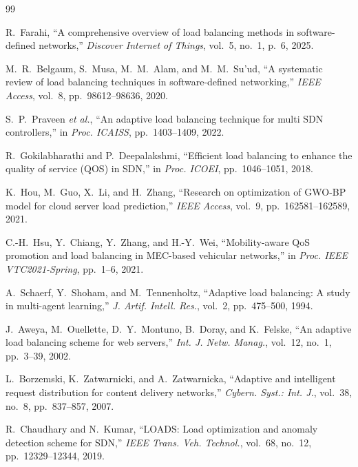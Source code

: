 \documentclass[12pt,a4paper]{report}
\begin{document}
\begin{thebibliography}{99}

R.~Farahi, ``A comprehensive overview of load balancing methods in software-defined networks,'' \textit{Discover Internet of Things}, vol.~5, no.~1, p.~6, 2025.

M.~R.~Belgaum, S.~Musa, M.~M.~Alam, and M.~M.~Su'ud, ``A systematic review of load balancing techniques in software-defined networking,'' \textit{IEEE Access}, vol.~8, pp.~98612--98636, 2020.

S.~P.~Praveen \textit{et al.}, ``An adaptive load balancing technique for multi SDN controllers,'' in \textit{Proc. ICAISS}, pp.~1403--1409, 2022.

R.~Gokilabharathi and P.~Deepalakshmi, ``Efficient load balancing to enhance the quality of service (QOS) in SDN,'' in \textit{Proc. ICOEI}, pp.~1046--1051, 2018.

K.~Hou, M.~Guo, X.~Li, and H.~Zhang, ``Research on optimization of GWO-BP model for cloud server load prediction,'' \textit{IEEE Access}, vol.~9, pp.~162581--162589, 2021.

C.-H.~Hsu, Y.~Chiang, Y.~Zhang, and H.-Y.~Wei, ``Mobility-aware QoS promotion and load balancing in MEC-based vehicular networks,'' in \textit{Proc. IEEE VTC2021-Spring}, pp.~1--6, 2021.

A.~Schaerf, Y.~Shoham, and M.~Tennenholtz, ``Adaptive load balancing: A study in multi-agent learning,'' \textit{J. Artif. Intell. Res.}, vol.~2, pp.~475--500, 1994.

J.~Aweya, M.~Ouellette, D.~Y.~Montuno, B.~Doray, and K.~Felske, ``An adaptive load balancing scheme for web servers,'' \textit{Int. J. Netw. Manag.}, vol.~12, no.~1, pp.~3--39, 2002.

L.~Borzemski, K.~Zatwarnicki, and A.~Zatwarnicka, ``Adaptive and intelligent request distribution for content delivery networks,'' \textit{Cybern. Syst.: Int. J.}, vol.~38, no.~8, pp.~837--857, 2007.

R.~Chaudhary and N.~Kumar, ``LOADS: Load optimization and anomaly detection scheme for SDN,'' \textit{IEEE Trans. Veh. Technol.}, vol.~68, no.~12, pp.~12329--12344, 2019.


\end{thebibliography}
\end{document}
